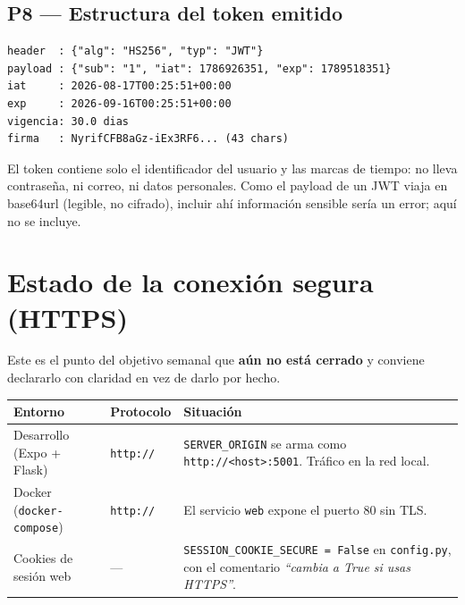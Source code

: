 \documentclass[11pt,letterpaper]{article}
\begin{document}
\subsection{P8 — Estructura del token emitido}

\begin{consola}[title={Decodificación del token (base64url, sin verificar firma)}]
\begin{lstlisting}[style=terminal]
header  : {"alg": "HS256", "typ": "JWT"}
payload : {"sub": "1", "iat": 1786926351, "exp": 1789518351}
iat     : 2026-08-17T00:25:51+00:00
exp     : 2026-09-16T00:25:51+00:00
vigencia: 30.0 dias
firma   : NyrifCFB8aGz-iEx3RF6... (43 chars)
\end{lstlisting}
\end{consola}

\noindent El token contiene solo el identificador del usuario y las marcas de tiempo: no
lleva contraseña, ni correo, ni datos personales. Como el payload de un JWT viaja en
base64url (legible, no cifrado), incluir ahí información sensible sería un error; aquí no se
incluye.

\section{Estado de la conexión segura (HTTPS)}
\label{sec:https}

Este es el punto del objetivo semanal que \textbf{aún no está cerrado} y conviene declararlo
con claridad en vez de darlo por hecho.

\vspace{0.4em}
\begin{center}
\begin{tabular}{@{}l l p{6.6cm}@{}}
\toprule
\textbf{Entorno} & \textbf{Protocolo} & \textbf{Situación} \\
\midrule
Desarrollo (Expo + Flask) & \texttt{http://} & \texttt{SERVER\_ORIGIN} se arma como \texttt{http://<host>:5001}. Tráfico en la red local. \\[3pt]
Docker (\texttt{docker-compose}) & \texttt{http://} & El servicio \texttt{web} expone el puerto 80 sin TLS. \\[3pt]
Cookies de sesión web & --- & \texttt{SESSION\_COOKIE\_SECURE = False} en \texttt{config.py}, con el comentario \emph{``cambia a True si usas HTTPS''}. \\
\bottomrule
\end{tabular}
\end{center}
\end{document}
